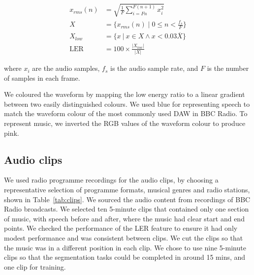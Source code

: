 \begin{align}
  x_{rms}(n) &= \sqrt{\frac{1}{F} \displaystyle\sum\limits_{i=Fn}^{F(n+1)} x_i^2}\\
  X &= \{x_{rms}(n) \mid 0 \leq n < \frac{f_s}{F}\}\\
  X_{low} &= \{x\ | \ x \in X \wedge x < 0.03 \overline{X} \}\\
  \text{LER} &= 100 \times \frac{|X_{low}|}{|X|}\label{eq:ler}
\end{align}

where $x_i$ are the audio samples, $f_s$ is the audio sample rate, and $F$ is the number of samples in each frame.



We coloured the waveform by mapping the low energy ratio to a linear gradient between two easily distinguished colours.
We used blue for representing speech to match the waveform colour of the most commonly used DAW in BBC Radio. To
represent music, we inverted the RGB values of the waveform colour to produce pink.

\subsection{Audio clips}
We used radio programme recordings for the audio clips, by choosing a representative selection of programme formats,
musical genres and radio stations, shown in Table~\ref{tab:clips}.  We sourced the audio content from recordings of BBC
Radio broadcasts. We selected ten 5-minute clips that contained only one section of music, with speech before and
after, where the music had clear start and end points. We checked the performance of the LER feature to ensure it had
only modest performance and was consistent between clips. We cut the clips so that the music was in a different
position in each clip.  We chose to use nine 5-minute clips so that the segmentation tasks could be completed in around
15 mins, and one clip for training.

